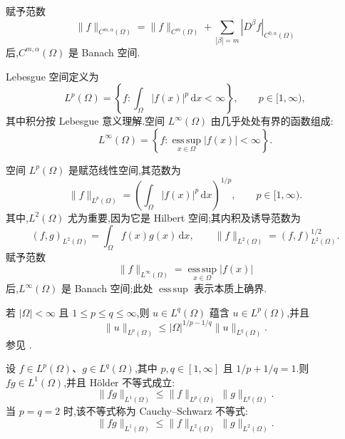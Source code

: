 \begin{note}\label{note:appendix-a-26}
赋予范数
\[
 \|f\|_{C^{m,\alpha}(\Omega)}=
 \|f\|_{C^m(\Omega)}+
 \sum_{|\beta|=m}|D^\beta f|_{C^{0,\alpha}(\Omega)}
\]
后,$C^{m,\alpha}(\Omega)$ 是 Banach 空间.
\end{note}

\begin{definition}\label{def:appendix-a-27}
Lebesgue 空间定义为
\[
 L^p(\Omega)=\left\{f:\int_\Omega |f(x)|^p\,\mathrm dx<\infty\right\},
 \qquad p\in[1,\infty),
\]
其中积分按 Lebesgue 意义理解.空间 $L^\infty(\Omega)$ 由几乎处处有界的函数组成:
\[
 L^\infty(\Omega)=\left\{f:\operatorname*{ess\,sup}_{x\in\Omega}|f(x)|<\infty\right\}.
\]
\end{definition}

\begin{note}[Lebesgue 空间]\label{note:appendix-a-28}
空间 $L^p(\Omega)$ 是赋范线性空间,其范数为
\[
 \|f\|_{L^p(\Omega)}=\left(\int_\Omega|f(x)|^p\,\mathrm dx\right)^{1/p},
 \qquad p\in[1,\infty).
\]
其中,$L^2(\Omega)$ 尤为重要,因为它是 Hilbert 空间;其内积及诱导范数为
\[
 (f,g)_{L^2(\Omega)}=\int_\Omega f(x)g(x)\,\mathrm dx,
 \qquad \|f\|_{L^2(\Omega)}=(f,f)_{L^2(\Omega)}^{1/2}.
\]
赋予范数
\[
 \|f\|_{L^\infty(\Omega)}=\operatorname*{ess\,sup}_{x\in\Omega}|f(x)|
\]
后,$L^\infty(\Omega)$ 是 Banach 空间;此处 $\operatorname*{ess\,sup}$ 表示本质上确界.

若 $|\Omega|<\infty$ 且 $1\le p\le q\le\infty$,则 $u\in L^q(\Omega)$ 蕴含 $u\in L^p(\Omega)$,并且
\begin{equation}\label{eq:appendix-a-8}
 \|u\|_{L^p(\Omega)}\le |\Omega|^{1/p-1/q}\|u\|_{L^q(\Omega)}.
\end{equation}
参见 \textcite[定理 2.8]{Adams1975}.
\end{note}

\begin{example}\label{ex:appendix-a-29}
设 $f\in L^p(\Omega)$、$g\in L^q(\Omega)$,其中 $p,q\in[1,\infty]$ 且 $1/p+1/q=1$.则 $fg\in L^1(\Omega)$,并且 Hölder 不等式成立:
\begin{equation}\label{eq:appendix-a-9}
 \|fg\|_{L^1(\Omega)}\le\|f\|_{L^p(\Omega)}\,\|g\|_{L^q(\Omega)}.
\end{equation}
当 $p=q=2$ 时,该不等式称为 Cauchy--Schwarz 不等式:
\begin{equation}\label{eq:appendix-a-10}
 \|fg\|_{L^1(\Omega)}\le\|f\|_{L^2(\Omega)}\,\|g\|_{L^2(\Omega)}.
\end{equation}
\end{example}


